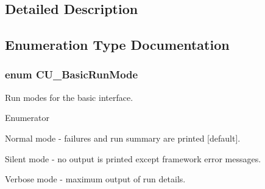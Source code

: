 \subsection{Detailed Description}


\subsection{Enumeration Type Documentation}
\hypertarget{group___basic_ga2f7ec57f8b59cfef5c5600bafa4865a6}{
\subsubsection[{C\+U\+\_\+\+Basic\+Run\+Mode}]{\setlength{\rightskip}{0pt plus 5cm}enum {\bf C\+U\+\_\+\+Basic\+Run\+Mode}}}\label{group___basic_ga2f7ec57f8b59cfef5c5600bafa4865a6}


Run modes for the basic interface. 

\begin{Desc}
\item[Enumerator]\par
\begin{description}
\item[{\em 
\hypertarget{group___basic_gga2f7ec57f8b59cfef5c5600bafa4865a6a9ef29da018d441e7c8e58b9a1676573b}{C\+U\+\_\+\+B\+R\+M\+\_\+\+N\+O\+R\+M\+A\+L}\label{group___basic_gga2f7ec57f8b59cfef5c5600bafa4865a6a9ef29da018d441e7c8e58b9a1676573b}
}]Normal mode -\/ failures and run summary are printed \mbox{[}default\mbox{]}. \item[{\em 
\hypertarget{group___basic_gga2f7ec57f8b59cfef5c5600bafa4865a6aa7f2cb5a71733216814b6e3d61dcb24e}{C\+U\+\_\+\+B\+R\+M\+\_\+\+S\+I\+L\+E\+N\+T}\label{group___basic_gga2f7ec57f8b59cfef5c5600bafa4865a6aa7f2cb5a71733216814b6e3d61dcb24e}
}]Silent mode -\/ no output is printed except framework error messages. \item[{\em 
\hypertarget{group___basic_gga2f7ec57f8b59cfef5c5600bafa4865a6a7ce505dc562e2fbf20505059114afea9}{C\+U\+\_\+\+B\+R\+M\+\_\+\+V\+E\+R\+B\+O\+S\+E}\label{group___basic_gga2f7ec57f8b59cfef5c5600bafa4865a6a7ce505dc562e2fbf20505059114afea9}
}]Verbose mode -\/ maximum output of run details. \end{description}
\end{Desc}


